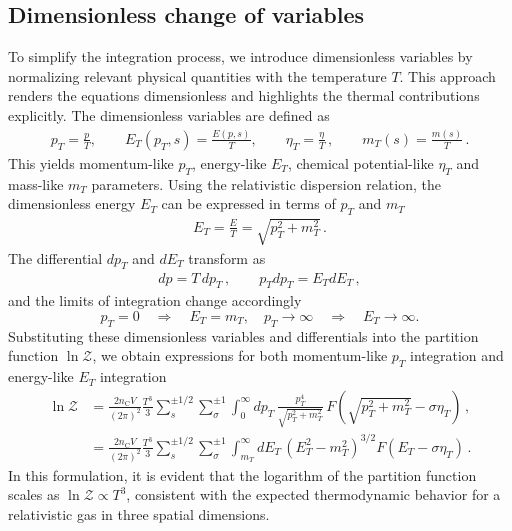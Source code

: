 \documentclass[epjST]{svjour}
\begin{document}
\subsection{Dimensionless change of variables}
\label{sec:dimensionless}
To simplify the integration process, we introduce dimensionless variables by normalizing relevant physical quantities with the temperature \( T \). This approach renders the equations dimensionless and highlights the thermal contributions explicitly. The dimensionless variables are defined as
\begin{align}
\label{eq:dimensionless_variables}
p_{T} = \frac{p}{T}, \qquad E_{T}(p_{T},s) = \frac{E(p,s)}{T}, \qquad \eta_{T} = \frac{\eta}{T}\,, \qquad m_{T}(s) = \frac{m(s)}{T}\,.
\end{align}
This yields momentum-like \(p_{T}\), energy-like \(E_{T}\), chemical potential-like \(\eta_{T}\) and mass-like \(m_{T}\) parameters. Using the relativistic dispersion relation, the dimensionless energy \( E_{T} \) can be expressed in terms of \( p_{T} \) and \( m_{T} \)
\begin{align}
E_{T} = \frac{E}{T} = \sqrt{p_{T}^{2} + m_{T}^{2}}\,.
\end{align}
The differential \( dp_{T} \) and \( dE_{T} \) transform as
\begin{align}
dp = T \, dp_{T}\,,\qquad p_{T}dp_{T} = E_{T} dE_{T}\,,
\end{align}
and the limits of integration change accordingly
\begin{equation}
p_{T} = 0 \quad \Rightarrow \quad E_{T} = m_{T}, \quad p_{T} \to \infty \quad \Rightarrow \quad E_{T} \to \infty.
\end{equation}
Substituting these dimensionless variables and differentials into the partition function \( \ln\mathcal{Z} \), we obtain expressions for both momentum-like \(p_{T}\) integration and energy-like \(E_{T}\) integration
\begin{align}
\label{eq:dimensionless_partition}
\ln\mathcal{Z} 
&= \frac{2 n_\mathrm{C} V}{(2\pi)^{2}} \frac{T^{3}}{3} \sum_{s}^{\pm1/2}\sum_{\sigma}^{\pm1} \int_{0}^{\infty} dp_{T} \, \frac{p_{T}^{4}}{\sqrt{p_{T}^{2} + m_{T}^{2}}} \, F\left(\sqrt{p_{T}^{2} + m_{T}^{2}} - \sigma\eta_{T}\right)\,,\\
\label{eq:dimensionless_partition2}
&= \frac{2 n_\mathrm{C} V}{(2\pi)^{2}} \frac{T^{3}}{3} \sum_{s}^{\pm1/2}\sum_{\sigma}^{\pm1} \int_{m_{T}}^{\infty} dE_{T} \, (E_{T}^2-m_{T}^2)^{3/2} F\left(E_{T} - \sigma\eta_{T}\right)\,.
\end{align}
In this formulation, it is evident that the logarithm of the partition function scales as \( \ln\mathcal{Z} \propto T^{3} \), consistent with the expected thermodynamic behavior for a relativistic gas in three spatial dimensions.
\end{document}
